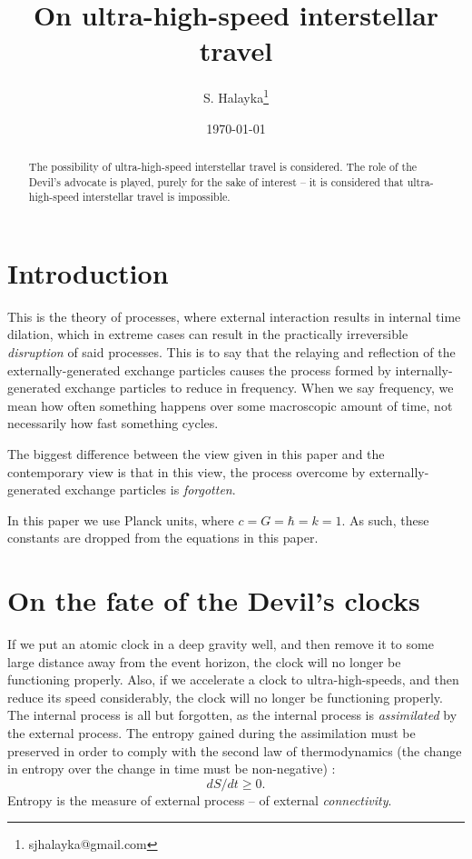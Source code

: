 \documentclass[12pt]{article}
\title{On ultra-high-speed interstellar travel}
\author{S. Halayka\footnote{sjhalayka@gmail.com}}
\date{\today}
\begin{document}
 
\maketitle

\begin{abstract}
The possibility of ultra-high-speed interstellar travel is considered.
The role of the Devil's advocate is played, purely for the sake of interest -- it is considered that ultra-high-speed interstellar travel is impossible.
\end{abstract}



\section{Introduction}
This is the theory of processes, where external interaction results in internal time dilation, which in extreme cases can result in the practically irreversible \textit{disruption} of said processes.
This is to say that the relaying and reflection of the externally-generated exchange particles causes the process formed by internally-generated exchange particles to reduce in frequency. 
When we say frequency, we mean how often something happens over some macroscopic amount of time, not necessarily how fast something cycles.

The biggest difference between the view given in this paper and the contemporary view is that in this view, the process overcome by externally-generated exchange particles is \textit{forgotten}.

In this paper we use Planck units, where $c = G = \hbar = k = 1$.
As such, these constants are dropped from the equations in this paper.




\section{On the fate of the Devil's clocks}
If we put an atomic clock in a deep gravity well, and then remove it to some large distance away from the event horizon, the clock will no longer be functioning properly.
Also, if we accelerate a clock to ultra-high-speeds, and then reduce its speed considerably, the clock will no longer be functioning properly.
The internal process is all but forgotten, as the internal process is \textit{assimilated} by the external process.
The entropy gained during the assimilation must be preserved in order to comply with the second law of thermodynamics (the change in entropy over the change in time must be non-negative) \cite{jacobson}:
\begin{equation}
dS/dt \geq 0.
\end{equation}
Entropy is the measure of external process -- of external \textit{connectivity}.
\end{document}
